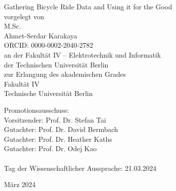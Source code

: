 
\thispagestyle{empty}
\begin{center}
    \huge{Gathering Bicycle Ride Data and Using it for the Good}\\[2pc]
    
    \large{vorgelegt von}\\
    \large{M.Sc.}\\
    \large{Ahmet-Serdar Karakaya}\\
    \large{ORCID: 0000-0002-2040-2782}\\[2pc]


    an der Fakultät IV – Elektrotechnik und Informatik\\
    der Technischen Universität Berlin\\
    zur Erlangung des akademischen Grades\\
    Fakultät IV\\
    Technische Universität Berlin
\end{center}
Promotionsausschuss:\\
Vorsitzender: Prof. Dr. Stefan Tai\\
Gutachter: Prof. Dr. David Bermbach\\
Gutachter: Prof. Dr. Heather Kaths\\
Gutachter: Prof. Dr. Odej Kao\\
\\
Tag der Wissenschaftlicher Aussprache: 21.03.2024\\
\begin{center}
März 2024
\end{center}

\afterpage{\null\thispagestyle{empty}\newpage}
